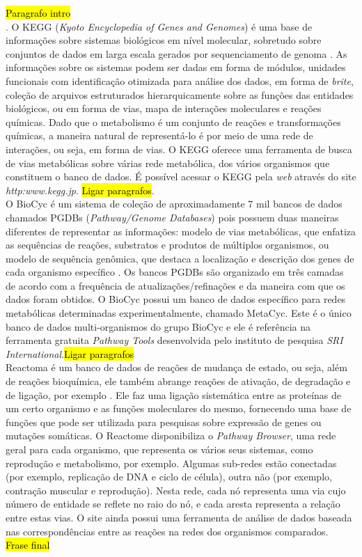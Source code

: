 \documentclass[conference]{IEEEtran}
\begin{document}
\hl{Paragrafo intro}  \\. O KEGG (\textit{Kyoto Encyclopedia of Genes and Genomes}) é uma base de informações sobre sistemas biológicos em nível molecular, sobretudo sobre conjuntos de dados em larga escala gerados por sequenciamento de genoma \cite{keggOverview}. As informações sobre os sistemas podem ser dadas em forma de módulos, unidades funcionais com identificação otimizada para análise dos dados, em forma de \textit{brite}, coleção de arquivos estruturados hierarquicamente sobre as funções das entidades biológicos, ou em forma de vias, mapa de interações moleculares e reações químicas. Dado que o metabolismo é um conjunto de reações e transformações químicas, a maneira natural de representá-lo é por meio de uma rede de interações, ou seja, em forma de vias. O KEGG oferece uma ferramenta de busca de vias metabólicas sobre várias rede metabólica, dos vários organismos que constituem o banco de dados. É possível acessar o KEGG pela \textit{web} através do site \textit{http:\/\/www.kegg.jp\/}. \hl{Ligar paragrafos}.\\
\indent O BioCyc é um sistema de coleção de aproximadamente 7 mil bancos de dados chamados PGDBs (\textit{Pathway/Genome Databases}) pois possuem duas maneiras diferentes de representar as informações: modelo de vias metabólicas, que enfatiza as sequências de reações, substratos e produtos de múltiplos organismos, ou modelo de sequência genômica, que destaca a localização e descrição dos genes de cada organismo específico \cite{biocycIntro}. Os bancos PGDBs são organizado em três camadas de acordo com a frequência de atualizações/refinações e da maneira com que os dados foram obtidos. O BioCyc possui um banco de dados específico para redes metabólicas determinadas experimentalmente, chamado MetaCyc. Este é o único banco de dados multi-organismos do grupo BioCyc e ele é referência na ferramenta gratuita \textit{Pathway Tools} desenvolvida pelo instituto de pesquisa \textit{SRI International}.\hl{Ligar paragrafos} \\
\indent Reactoma é um banco de dados de reações de mudança de estado, ou seja, além de reações bioquímica, ele também abrange reações de ativação, de degradação e de ligação, por exemplo \cite{reactomeUsersguide}. Ele faz uma ligação sistemática entre as proteínas de um certo organismo e as funções moleculares do mesmo, fornecendo uma base de funções que pode ser utilizada para pesquisas sobre expressão de genes ou mutações somáticas. O Reactome disponibiliza o \textit{Pathway Browser}, uma rede geral para cada organismo, que representa os vários seus sistemas, como reprodução e metabolismo, por exemplo. Algumas sub-redes estão conectadas (por exemplo, replicação de DNA e ciclo de célula), outra não (por exemplo, contração muscular e reprodução). Nesta rede, cada nó representa uma via cujo número de entidade se reflete no raio do nó, e cada aresta representa a relação entre estas vias. O site ainda possui uma ferramenta de análise de dados baseada nas correspondências entre as reações na redes dos organismos comparados. \\
\hl{Frase final} \\
\end{document}
